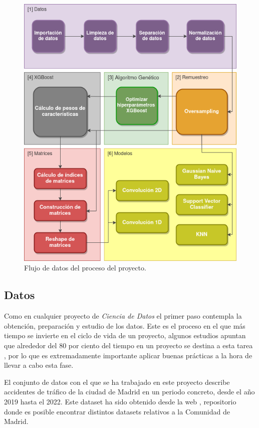     \begin{figure}[H]
        \centering
        \includegraphics[width=13cm]{archivos/4.Metodologia/DataflowImageESP}
        \caption{Flujo de datos del proceso del proyecto.}
        \label{DataflowImage}
    \end{figure}



    \subsection{Datos}


            Como en cualquier proyecto de \textit{Ciencia de Datos} el primer paso contempla la obtención, preparación y estudio de los datos. Este es el proceso en el que más tiempo se invierte en el ciclo de vida de un proyecto, algunos estudios apuntan que alrededor del 80 por ciento del tiempo en un proyecto se destina a esta tarea \cite{LifecycleDataScienceProjectsTimes}, por lo que es extremadamente importante aplicar buenas prácticas a la hora de llevar a cabo esta fase.

            El conjunto de datos con el que se ha trabajado en este proyecto describe accidentes de tráfico de la ciudad de Madrid en un periodo concreto, desde el año 2019 hasta el 2022. Este dataset ha sido obtenido desde la web \cite{DatasetMadrid}, repositorio donde es posible encontrar distintos datasets relativos a la Comunidad de Madrid.

